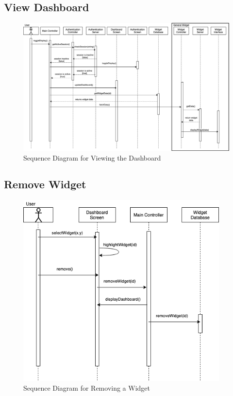 \documentclass[]{article}
\begin{document}
\subsection{View Dashboard}
\label{sub:view_dashboard_seq}
\begin{figure}[H]
\begin{center}
\includegraphics[width=1.25\textwidth, angle=270]{D3/images/ViewDashboardSeq.png}
\end{center}
\caption{Sequence Diagram for Viewing the Dashboard}
\label{fig:View Dashboard}
\end{figure}

\subsection{Remove Widget}
\label{sub:remove_seq}
\begin{figure}[H]
\begin{center}
\includegraphics[width=0.95\textwidth]{D3/images/RemoveWidget.png}
\end{center}
\caption{Sequence Diagram for Removing a Widget}
\label{fig:Remove Widget}
\end{figure}
\end{document}
